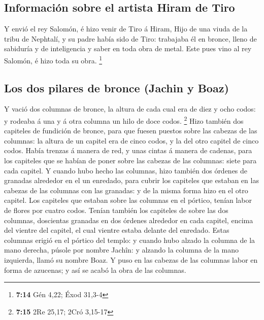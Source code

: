 \hypertarget{informaciuxf3n-sobre-el-artista-hiram-de-tiro}{%
\subsection{Información sobre el artista Hiram de
Tiro}\label{informaciuxf3n-sobre-el-artista-hiram-de-tiro}}

 Y envió el rey Salomón, é hizo venir de Tiro á Hiram,
 Hijo de una viuda de la tribu de Nephtalí, y su padre
había sido de Tiro: trabajaba él en bronce, lleno de sabiduría y de
inteligencia y saber en toda obra de metal. Este pues vino al rey
Salomón, é hizo toda su obra. \footnote{\textbf{7:14} Gén 4,22; Éxod
  31,3-4}

\hypertarget{los-dos-pilares-de-bronce-jachin-y-boaz}{%
\subsection{Los dos pilares de bronce (Jachin y
Boaz)}\label{los-dos-pilares-de-bronce-jachin-y-boaz}}

 Y vació dos columnas de bronce, la altura de cada cual
era de diez y ocho codos: y rodeaba á una y á otra columna un hilo de
doce codos. \footnote{\textbf{7:15} 2Re 25,17; 2Cró 3,15-17}
 Hizo también dos capiteles de fundición de bronce, para
que fuesen puestos sobre las cabezas de las columnas: la altura de un
capitel era de cinco codos, y la del otro capitel de cinco codos.
 Había trenzas á manera de red, y unas cintas á manera de
cadenas, para los capiteles que se habían de poner sobre las cabezas de
las columnas: siete para cada capitel.  Y cuando hubo
hecho las columnas, hizo también dos órdenes de granadas alrededor en el
un enredado, para cubrir los capiteles que estaban en las cabezas de las
columnas con las granadas: y de la misma forma hizo en el otro capitel.
 Los capiteles que estaban sobre las columnas en el
pórtico, tenían labor de flores por cuatro codos.  Tenían
también los capiteles de sobre las dos columnas, doscientas granadas en
dos órdenes alrededor en cada capitel, encima del vientre del capitel,
el cual vientre estaba delante del enredado.  Estas
columnas erigió en el pórtico del templo: y cuando hubo alzado la
columna de la mano derecha, púsole por nombre Jachîn: y alzando la
columna de la mano izquierda, llamó su nombre Boaz.  Y
puso en las cabezas de las columnas labor en forma de azucenas; y así se
acabó la obra de las columnas.

